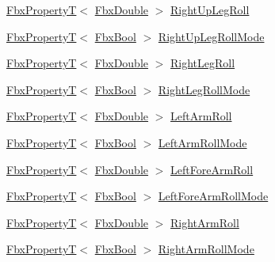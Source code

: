 \begin{DoxyCompactItemize}
\item 
\hyperlink{class_fbx_property_t}{Fbx\+PropertyT}$<$ \hyperlink{fbxtypes_8h_a171e72a1c46fc15c1a6c9c31948c1c5b}{Fbx\+Double} $>$ \hyperlink{class_fbx_character_a32c6ee078b478ecc10b0c021b515db26}{Right\+Up\+Leg\+Roll}
\item 
\hyperlink{class_fbx_property_t}{Fbx\+PropertyT}$<$ \hyperlink{fbxtypes_8h_a92e0562b2fe33e76a242f498b362262e}{Fbx\+Bool} $>$ \hyperlink{class_fbx_character_a29251f940985b5d6f9cd0b972ecf7070}{Right\+Up\+Leg\+Roll\+Mode}
\item 
\hyperlink{class_fbx_property_t}{Fbx\+PropertyT}$<$ \hyperlink{fbxtypes_8h_a171e72a1c46fc15c1a6c9c31948c1c5b}{Fbx\+Double} $>$ \hyperlink{class_fbx_character_a2f5abce5bc5a72830f029b959077d7b2}{Right\+Leg\+Roll}
\item 
\hyperlink{class_fbx_property_t}{Fbx\+PropertyT}$<$ \hyperlink{fbxtypes_8h_a92e0562b2fe33e76a242f498b362262e}{Fbx\+Bool} $>$ \hyperlink{class_fbx_character_ad8adb21239c56498bd85e983931c825b}{Right\+Leg\+Roll\+Mode}
\item 
\hyperlink{class_fbx_property_t}{Fbx\+PropertyT}$<$ \hyperlink{fbxtypes_8h_a171e72a1c46fc15c1a6c9c31948c1c5b}{Fbx\+Double} $>$ \hyperlink{class_fbx_character_a7faee1f8cc844f30b5b4cca5fc3782d7}{Left\+Arm\+Roll}
\item 
\hyperlink{class_fbx_property_t}{Fbx\+PropertyT}$<$ \hyperlink{fbxtypes_8h_a92e0562b2fe33e76a242f498b362262e}{Fbx\+Bool} $>$ \hyperlink{class_fbx_character_a14cf83f4c540a9529627a471a3538b38}{Left\+Arm\+Roll\+Mode}
\item 
\hyperlink{class_fbx_property_t}{Fbx\+PropertyT}$<$ \hyperlink{fbxtypes_8h_a171e72a1c46fc15c1a6c9c31948c1c5b}{Fbx\+Double} $>$ \hyperlink{class_fbx_character_a1b8acf0b566e44d7bde3ed046970a013}{Left\+Fore\+Arm\+Roll}
\item 
\hyperlink{class_fbx_property_t}{Fbx\+PropertyT}$<$ \hyperlink{fbxtypes_8h_a92e0562b2fe33e76a242f498b362262e}{Fbx\+Bool} $>$ \hyperlink{class_fbx_character_ad39cf58d8bedc3f53f81361425d1253d}{Left\+Fore\+Arm\+Roll\+Mode}
\item 
\hyperlink{class_fbx_property_t}{Fbx\+PropertyT}$<$ \hyperlink{fbxtypes_8h_a171e72a1c46fc15c1a6c9c31948c1c5b}{Fbx\+Double} $>$ \hyperlink{class_fbx_character_a12e97f9c94917b7eb1df15d3bbffe6e2}{Right\+Arm\+Roll}
\item 
\hyperlink{class_fbx_property_t}{Fbx\+PropertyT}$<$ \hyperlink{fbxtypes_8h_a92e0562b2fe33e76a242f498b362262e}{Fbx\+Bool} $>$ \hyperlink{class_fbx_character_a3b0444d10aa3a7e90c07b7f0eba087d8}{Right\+Arm\+Roll\+Mode}

\end{DoxyCompactItemize}

